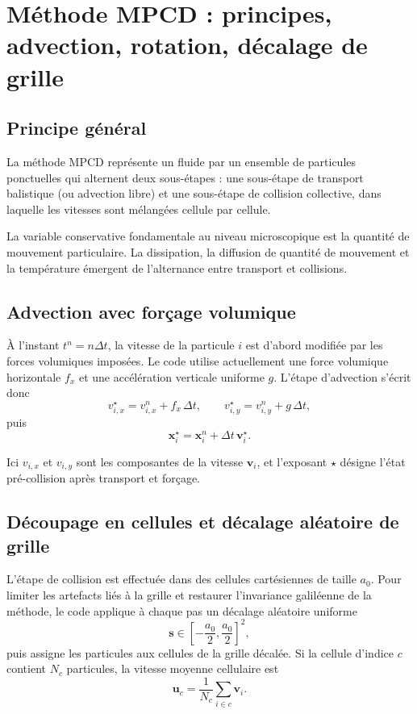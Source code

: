 \documentclass[11pt,a4paper]{article}
\begin{document}
\section{Méthode MPCD : principes, advection, rotation, décalage de grille}

\subsection{Principe général}

La méthode MPCD représente un fluide par un ensemble de particules ponctuelles qui alternent deux sous-étapes : une sous-étape de transport balistique (ou advection libre) et une sous-étape de collision collective, dans laquelle les vitesses sont mélangées cellule par cellule.

La variable conservative fondamentale au niveau microscopique est la quantité de mouvement particulaire. La dissipation, la diffusion de quantité de mouvement et la température émergent de l'alternance entre transport et collisions.

\subsection{Advection avec forçage volumique}

À l'instant $t^n = n\Delta t$, la vitesse de la particule $i$ est d'abord modifiée par les forces volumiques imposées. Le code utilise actuellement une force volumique horizontale $f_x$ et une accélération verticale uniforme $g$. L'étape d'advection s'écrit donc
\begin{equation}
 v_{i,x}^{\star} = v_{i,x}^{n} + f_x\,\Delta t,
 \qquad
 v_{i,y}^{\star} = v_{i,y}^{n} + g\,\Delta t,
\end{equation}
puis
\begin{equation}
 \bm{x}_i^{\star} = \bm{x}_i^{n} + \Delta t\,\bm{v}_i^{\star}.
\end{equation}

Ici $v_{i,x}$ et $v_{i,y}$ sont les composantes de la vitesse $\bm{v}_i$, et l'exposant $\star$ désigne l'état pré-collision après transport et forçage.

\subsection{Découpage en cellules et décalage aléatoire de grille}

L'étape de collision est effectuée dans des cellules cartésiennes de taille $a_0$. Pour limiter les artefacts liés à la grille et restaurer l'invariance galiléenne de la méthode, le code applique à chaque pas un décalage aléatoire uniforme
\begin{equation}
 \bm{s} \in \left[-\frac{a_0}{2},\frac{a_0}{2}\right]^2,
\end{equation}
puis assigne les particules aux cellules de la grille décalée. Si la cellule d'indice $c$ contient $N_c$ particules, la vitesse moyenne cellulaire est
\begin{equation}
 \bm{u}_c = \frac{1}{N_c}\sum_{i\in c} \bm{v}_i.
\end{equation}
\end{document}
